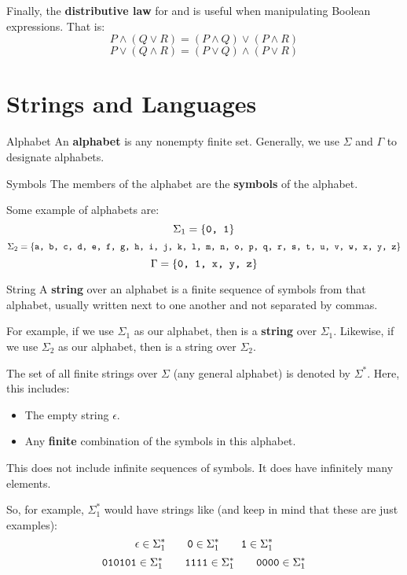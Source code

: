 \documentclass[letterpaper]{article}
\begin{document}
Finally, the \textbf{distributive law} for  and  is useful when manipulating Boolean expressions. That is: 
\[P \land (Q \lor R) = (P \land Q) \lor (P \land R)\]
\[P \lor (Q \land R) = (P \lor Q) \land (P \lor R)\]





\newpage 
\section{Strings and Languages}
\begin{definition}{Alphabet}{}
    An \textbf{alphabet} is any nonempty finite set. Generally, we use $\Sigma$ and $\Gamma$ to designate alphabets.
\end{definition}

\begin{definition}{Symbols}{}
    The members of the alphabet are the \textbf{symbols} of the alphabet.
\end{definition}

Some example of alphabets are: 
\[\Sigma_1 = \{\texttt{0, 1}\}\]
\[\Sigma_2 = \{\texttt{a, b, c, d, e, f, g, h, i, j, k, l, m, n, o, p, q, r, s, t, u, v, w, x, y, z}\}\]
\[\Gamma = \{\texttt{0, 1, x, y, z}\}\]

\begin{definition}{String}{}
    A \textbf{string} over an alphabet is a finite sequence of symbols from that alphabet, usually written next to one another and not separated by commas. 
\end{definition}
For example, if we use $\Sigma_1$ as our alphabet, then  is a \textbf{string} over $\Sigma_1$. Likewise, if we use $\Sigma_2$ as our alphabet, then  is a string over $\Sigma_2$. 

\bigskip

The set of all finite strings over $\Sigma$ (any general alphabet) is denoted by $\Sigma^*$. Here, this includes:
\begin{itemize}
    \item The empty string $\epsilon$.
    \item Any \textbf{finite} combination of the symbols in this alphabet.
\end{itemize}
This does not include infinite sequences of symbols. It does have infinitely many elements. 

\bigskip

So, for example, $\Sigma_{1}^{*}$ would have strings like (and keep in mind that these are just examples): 
\[\epsilon \in \Sigma_{1}^{*} \qquad \texttt{0} \in \Sigma_{1}^{*} \qquad \texttt{1} \in \Sigma_{1}^{*}\]
\[\texttt{010101} \in \Sigma_{1}^{*} \qquad \texttt{1111} \in \Sigma_{1}^{*} \qquad \texttt{0000} \in \Sigma_{1}^{*}\]
\end{document}
